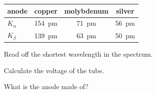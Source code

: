 \begin{center}
\begin{tabular}{lccc}
 anode & copper & molybdenum & silver \\ \hline
 $K_\alpha$ & \SI{154}{\pico\m} & \SI{71}{\pico\m} & \SI{56}{\pico\m} \\
 $K_\beta$ & \SI{139}{\pico\m} & \SI{63}{\pico\m} & \SI{50}{\pico\m}
\end{tabular}
\end{center}

\begin{abcliste}
\abc Read off the shortest wavelength in the spectrum.

\abc Calculate the voltage of the tube.

\abc What is the anode made of?
\end{abcliste}
